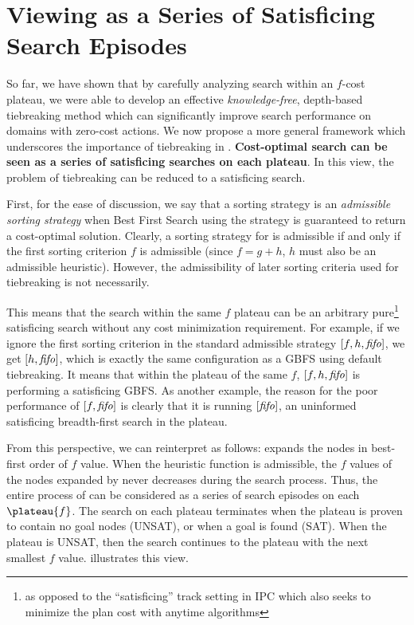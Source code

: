 \clearpage 
\section{Viewing \astar as a Series of Satisficing Search Episodes}
\label{sec:discussion}

So far, we have shown that by carefully analyzing search within an $f$-cost plateau,
we were able to develop an effective
{\it knowledge-free}, depth-based tiebreaking method which can significantly improve search performance on domains with zero-cost actions.
We now propose a more general framework which underscores the importance of tiebreaking in \astar.
\textbf{Cost-optimal search
can be seen as a series of satisficing searches on each plateau}. In this view, the problem of tiebreaking can be
reduced to a satisficing search.

First, for the ease of discussion, 
we say that a sorting strategy is an \emph{admissible sorting strategy}
when Best First Search using the strategy is guaranteed to return a cost-optimal solution.
Clearly, a sorting strategy for \astar is admissible if and only if the 
first sorting criterion $f$ is admissible (since $f=g+h$, $h$ must also be an admissible heuristic).
However, the admissibility of later sorting criteria used for tiebreaking is not necessarily.

This means that the search within the same $f$ plateau can be an arbitrary pure\footnote{as opposed to the ``satisficing'' track setting in IPC which also seeks to minimize the plan cost with anytime algorithms} satisficing search without any cost minimization requirement. For example,
if we ignore the first sorting criterion in the standard admissible strategy
$[f,h,{\text{\textit{fifo}}}]$, we get $[h,{\text{\textit{fifo}}}]$, which is exactly
the same configuration as a GBFS using \fifo default tiebreaking. It
means that within the plateau of the same $f$, $[f,h,{\text{\textit{fifo}}}]$ is
performing a satisficing GBFS.
As another example, the reason for the poor performance of $[f,{\text{\textit{fifo}}}]$
is clearly that it is running $[{\text{\textit{fifo}}}]$,
an uninformed satisficing breadth-first search in the plateau.

From this perspective, we can reinterpret \astar as follows: \astar expands the nodes in best-first order of $f$ value. When the
heuristic function is admissible, the $f$ values of the nodes expanded by \astar never decreases during the
search process.
Thus, the entire process of \astar can be considered as a series of search episodes on each $\plateau{f}$.
The search on each plateau terminates when the plateau is proven to contain no goal nodes (UNSAT), or when a goal is found (SAT).
When the plateau is UNSAT, then the search continues to the plateau with the next smallest $f$ value.
 illustrates this view.

